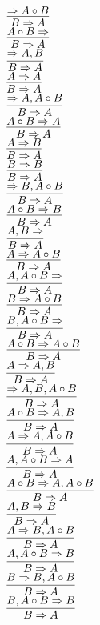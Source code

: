 \documentclass[11pt]{article}
\begin{document}
\begin{center}
\bigskip
\\$\infer{B\Rightarrow A}{\Rightarrow A\circ B}$
\bigskip
\\$\infer{B\Rightarrow A}{A\circ B\Rightarrow }$
\bigskip
\\$\infer{B\Rightarrow A}{\Rightarrow A, B}$
\bigskip
\\$\infer{B\Rightarrow A}{A\Rightarrow A}$
\bigskip
\\$\infer{B\Rightarrow A}{\Rightarrow A, A\circ B}$
\bigskip
\\$\infer{B\Rightarrow A}{A\circ B\Rightarrow A}$
\bigskip
\\$\infer{B\Rightarrow A}{A\Rightarrow B}$
\bigskip
\\$\infer{B\Rightarrow A}{B\Rightarrow B}$
\bigskip
\\$\infer{B\Rightarrow A}{\Rightarrow B, A\circ B}$
\bigskip
\\$\infer{B\Rightarrow A}{A\circ B\Rightarrow B}$
\bigskip
\\$\infer{B\Rightarrow A}{A, B\Rightarrow }$
\bigskip
\\$\infer{B\Rightarrow A}{A\Rightarrow A\circ B}$
\bigskip
\\$\infer{B\Rightarrow A}{A, A\circ B\Rightarrow }$
\bigskip
\\$\infer{B\Rightarrow A}{B\Rightarrow A\circ B}$
\bigskip
\\$\infer{B\Rightarrow A}{B, A\circ B\Rightarrow }$
\bigskip
\\$\infer{B\Rightarrow A}{A\circ B\Rightarrow A\circ B}$
\bigskip
\\$\infer{B\Rightarrow A}{A\Rightarrow A, B}$
\bigskip
\\$\infer{B\Rightarrow A}{\Rightarrow A, B, A\circ B}$
\bigskip
\\$\infer{B\Rightarrow A}{A\circ B\Rightarrow A, B}$
\bigskip
\\$\infer{B\Rightarrow A}{A\Rightarrow A, A\circ B}$
\bigskip
\\$\infer{B\Rightarrow A}{A, A\circ B\Rightarrow A}$
\bigskip
\\$\infer{B\Rightarrow A}{A\circ B\Rightarrow A, A\circ B}$
\bigskip
\\$\infer{B\Rightarrow A}{A, B\Rightarrow B}$
\bigskip
\\$\infer{B\Rightarrow A}{A\Rightarrow B, A\circ B}$
\bigskip
\\$\infer{B\Rightarrow A}{A, A\circ B\Rightarrow B}$
\bigskip
\\$\infer{B\Rightarrow A}{B\Rightarrow B, A\circ B}$
\bigskip
\\$\infer{B\Rightarrow A}{B, A\circ B\Rightarrow B}$

\end{center}
\end{document}
